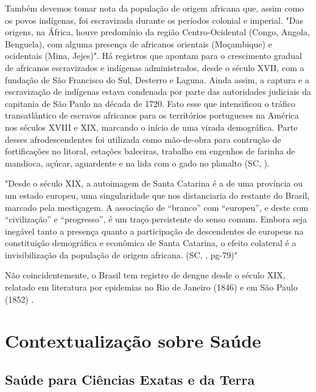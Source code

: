 \indent Também devemos tomar nota da população de origem africana que, assim como os povos indígenas, foi escravizada durante os períodos colonial e imperial. "Das origens, na África, houve predomínio da região Centro-Ocidental (Congo, Angola, Benguela), com alguma presença de africanos orientais (Moçambique) e ocidentais (Mina, Jejes)". Há registros que apontam para o crescimento gradual de africanos escravizados e indígenas administrados, desde o século XVII, com a fundação de São Francisco do Sul, Desterro e Laguna. Ainda assim, a captura e a escravização de indígenas estava condenada por parte das autoridades judiciais da capitania de São Paulo na década de 1720. Fato esse que intensificou o tráfico transatlântico de escravos africanos para os territórios portugueses na América nos séculos XVIII e XIX, marcando o início de uma virada demográfica. Parte desses afrodescendentes foi utilizada como mão-de-obra para contrução de fortificações no litoral, estações baleeiras, trabalho em engenhos de farinha de mandioca, açúcar, aguardente e na lida com o gado no planalto (\acrlong{SC}, \citeyear{AtlasSCpopulacao}). 

\begin{citacao}
"Desde o século XIX, a autoimagem de Santa Catarina é a de uma província ou um estado europeu, uma singularidade que nos distanciaria do restante do Brasil, marcado pela mestiçagem. A associação de “branco” com “europeu”, e deste com “civilização” e “progresso”, é um traço persistente do senso comum. Embora seja
inegável tanto a presença quanto a participação de descendentes de europeus na
constituição demográfica e econômica de Santa Catarina, o efeito colateral é a invisibilização da população de origem africana. (\acrlong{SC}, \citeyear{AtlasSCpopulacao}, pg-79)"
\end{citacao}

\indent Não coincidentemente, o Brasil tem registro de dengue desde o século XIX, relatado em literatura por epidemias no Rio de Janeiro (1846) e em São Paulo (1852) \cite{Valle2015Dengue}.

\section{Contextualização sobre Saúde}

\subsection{Saúde para Ciências Exatas e da Terra}

